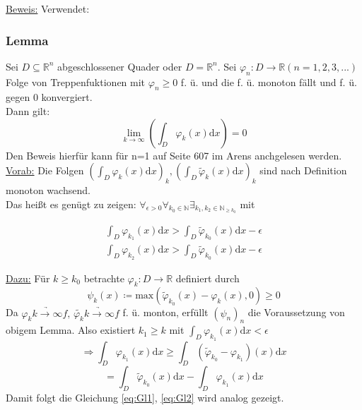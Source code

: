 \underline{Beweis:}
Verwendet:
\subsubsection{Lemma} Sei $D \subseteq \mathbb{R}^n$ abgeschlossener Quader oder $D= \mathbb{R}^n$. Sei $\varphi_n \colon D \to \mathbb{R} (n=1,2,3,...)$ Folge von Treppenfuktionen mit $\varphi_n \geq 0$ f. ü. und die f. ü. monoton fällt und f. ü. gegen 0 konvergiert.\\
Dann gilt:
\[\lim_{k \to \infty} \left(\int_D\varphi_k(x)\text{d}x\right) = 0\]
Den Beweis hierfür kann für n=1 auf Seite 607 im Arens anchgelesen werden.\\

\underline{Vorab:} Die Folgen $\left(\int_D \varphi_k (x) \text{d}x\right)_k, \left(\int_D \tilde{\varphi}_k (x) \text{d}x\right)_k$ sind nach Definition monoton wachsend.\\
Das heißt es genügt zu zeigen: $\forall_{\epsilon > 0} \forall_{k_0 \in \mathbb{N}} \exists_{k_1,k_2 \in \mathbb{N}_{\geq k_0}}$ mit

\begin{align}
	\int_D \varphi_{k_1}(x) \text{d}x > \int_D \tilde{\varphi}_{k_0}(x) \text{d}x - \epsilon \label{eq:Gl1}\\
	\int_D \varphi_{k_2}(x) \text{d}x > \int_D \tilde{\varphi}_{k_0}(x) \text{d}x - \epsilon \label{eq:Gl2}
\end{align}

\underline{Dazu:} Für $k \geq k_0$ betrachte $\varphi_k \colon D \to \mathbb{R}$ definiert durch
\[\psi_k(x) \coloneqq \text{max} \left( \tilde{\varphi}_{k_0}(x) - \varphi_k(x), 0\right) \geq 0\]
Da $\varphi_k \underrightarrow{k \to \infty} f , \, \tilde{\varphi_k} \underrightarrow{k \to \infty} f$ f. ü. monton, erfüllt $(\psi_n)_n$ die Voraussetzung von obigem Lemma. Also existiert $k_1 \geq k$ mit $\int_D \varphi_{k_1}(x) \text{d}x < \epsilon$\\
\[\Rightarrow \int_D \varphi_{k_1}(x) \text{d}x \geq \int_D \left(\tilde{\varphi}_{k_0} - \varphi_{k_1}\right)(x)\text{d}x\]
\[= \int_D \tilde{\varphi}_{k_0}(x)\text{d}x - \int_D \varphi_{k_1}(x)\text{d}x\]
Damit folgt die Gleichung \ref{eq:Gl1}, \ref{eq:Gl2} wird analog gezeigt.

